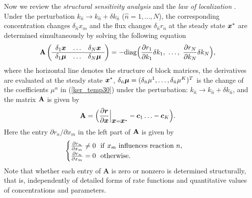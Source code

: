 \documentclass[ amsmath,amssymb,nofootinbib
]{revtex4-1}
\def\mbf#1{\mbox{\boldmath $#1$}}
\newcommand{\bx}{{\mbf x}}
\newcommand{\br}{{\mbf r}}
\newcommand{\p}{\partial}
\begin{document}
Now we review the {\it structural sensitivity analysis} \cite{Mochizuki} and  the {\it law of localization} \cite{OM}. 
Under the  perturbation $k_{\hat{n}} \to k_{\hat{n}} + \delta k_{\hat{n}}$ ($\hat{n} = 1,\ldots,N$),
the corresponding concentration changes $\delta_{\hat{n}} x_m$ and the flux changes $\delta_{\hat{n}} r_n$
at the steady state $\bx^*$ are  determined simultaneously by solving the following equation
\begin{align} %
{\bf A} \left(
\begin{array}{cccc}
\delta_1 {  \mbf x} &  \ldots  &\delta_{N} { \mbf  x}  \\\hline
\delta_{1} {  \mbf \mu} &  \ldots & \delta_{N} {  \mbf \mu}  \\
\end{array}
\right)
= - {\rm diag}\Big(\frac{\partial r_1}{\partial k_1}\delta k_1,  \  \ldots,  \  \frac{\partial r_N}{\partial k_N} \delta k_N \Big),\nonumber
\end{align}
where
the horizontal line denotes the structure of block matrices,
the derivatives are evaluated at the steady state $\bx^*$,
$\delta_{\hat{n}}{\mbf \mu} = (\delta_{\hat{n}}\mu^1,\ldots,\delta_{\hat{n}}\mu^K)^T$
is the change of the coefficients $\mu^\alpha$ in (\ref{ker_temp30})
under the perturbation: $k_{\hat{n}} \to k_{\hat{n}} + \delta k_{\hat{n}}$,
and the matrix ${\bf A}$ is given by
\begin{align} \label{e:A_temp30}
   {\bf A} = \Big( \frac{\p \br}{\p \bx}\Big|_{\bx=\bx^*} -{\mbf c}_1 \ldots -{\mbf c}_K \Big).
\end{align}
Here the entry $\partial r_n/\partial x_m$ in the left part of $\bf A$ is given by 
\begin{align}
\begin{cases}
\frac{\partial  {\color{black}r}_n}{\partial x_m}     \neq 0 \  \    {\rm  if}\  x_m \ {\rm influences \ reaction} \ n,  \\
  \frac{\partial {\color{black}r}_n}{\partial x_m} =0\  \  {\rm otherwise.}\ 
  \end{cases} 
\label{reg}
\end{align}
Note that whether each entry of {\bf A} is zero or nonzero is determined structurally, that is,  independently of  detailed forms of rate functions and quantitative values of concentrations and parameters. 
\end{document}
